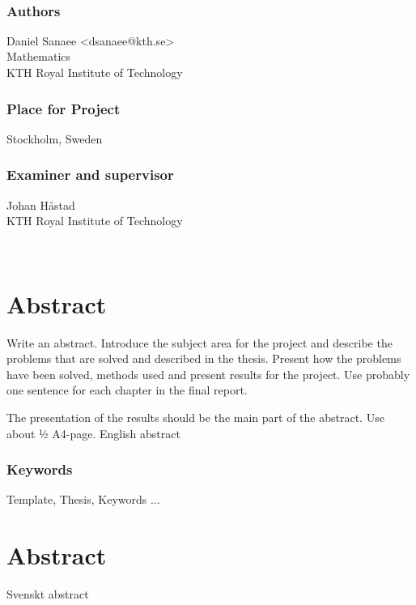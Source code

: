 \newpage
\thispagestyle{plain}
~\\
\vfill
{ 
	\subsection*{Authors}
	Daniel Sanaee <dsanaee@kth.se>\\
	Mathematics\\
	KTH Royal Institute of Technology
	
	\subsection*{Place for Project}
	Stockholm, Sweden
	
	\subsection*{Examiner and supervisor}
	Johan Håstad\\
	KTH Royal Institute of Technology
	
	~
}

\newpage
\thispagestyle{plain}
\chapter*{Abstract}

\vspace{2cm}
Write an abstract. Introduce the subject area for the project and describe the problems that are solved and described in the thesis. Present how the problems have been solved, methods used and present results for the project. Use probably one sentence for each chapter in the final report.

The presentation of the results should be the main part of the abstract. Use about ½ A4-page.
English abstract




\subsection*{Keywords}
Template, Thesis, Keywords ...





\newpage
\thispagestyle{plain}
\chapter*{Abstract}
Svenskt abstract
\begin{comment}
Svensk version av abstract – samma titel på svenska som på engelska.

Skriv samma abstract på svenska. Introducera ämnet för projektet och beskriv problemen som löses i materialet. Presentera 
\end{comment}
